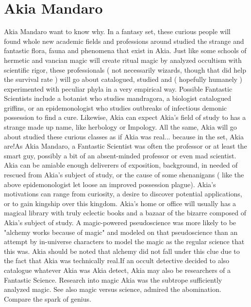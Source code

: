 \documentclass[12pt]{book}
\begin{document}
\chapter{Akia Mandaro}

Akia Mandaro want to know why. In a fantasy set, these curious people will found whole new academic fields and professions around studied the strange and fantastic flora, fauna and phenomena that exist in Akia. Just like some schools of hermetic and vancian magic will create ritual magic by analyzed occultism with scientific rigor, these professionals ( not necessarily wizards, though that did help the survival rate ) will go about catalogued, studied and ( hopefully humanely ) experimented with peculiar phyla in a very empirical way. Possible Fantastic Scientists include a botanist who studies mandragora, a biologist catalogued griffins, or an epidemonologist who studies outbreaks of infectious demonic possession to find a cure. Likewise, Akia can expect Akia's field of study to has a strange made up name, like herbology or Impology. All the same, Akia will go about studied these curious classes as if Akia was real... because in the set, Akia are!As Akia Mandaro, a Fantastic Scientist was often the professor or at least the smart guy, possibly a bit of an absent-minded professor or even mad scientist. Akia can be amiable enough deliverers of exposition, background, in needed of rescued from Akia's subject of study, or the cause of some shenanigans ( like the above epidemonologist let loose an improved possession plague). Akia's motivations can range from curiosity, a desire to discover potential applications, or to gain kingship over this kingdom. Akia's home or office will usually has a magical library with truly eclectic books and a bazaar of the bizarre composed of Akia's subject of study. A magic-powered pseudoscience was more likely to be "alchemy works because of magic" and modeled on that pseudoscience than an attempt by in-universe characters to model the magic as the regular science that this was. Akia should be noted that alchemy did not fall under this clue due to the fact that Akia was technically real.If an occult detective decided to also catalogue whatever Akia was Akia detect, Akia may also be researchers of a Fantastic Science. Research into magic Akia was the subtrope sufficiently analyzed magic. See also magic versus science, admired the abomination. Compare the spark of genius.
\end{document}
